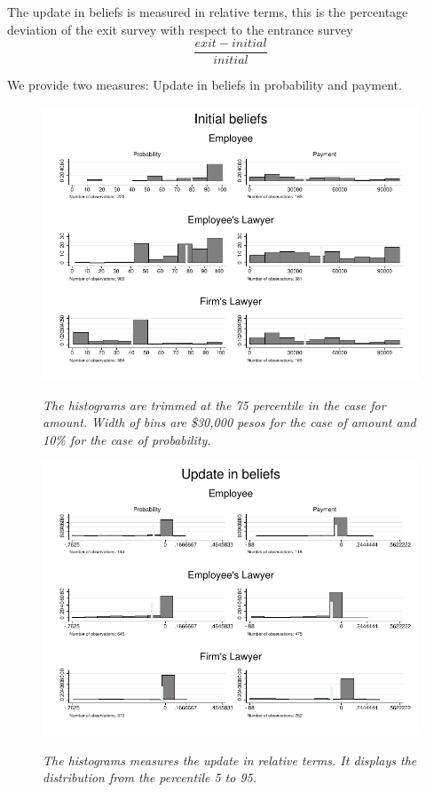 \documentclass[12pt]{article}
\theoremstyle{named}
\newcommand{\folder}{./Effect}
\begin{document}
The update in beliefs is measured in relative terms, this is the percentage deviation of the exit survey with respect to the entrance survey
\[\frac{exit-initial}{initial}\]

We provide two measures: Update in beliefs in probability and payment.\\

\begin{center}
\scriptsize{}
\end{center}

\begin{figure}[H]
\label{diff}
\begin{center}
\includegraphics[width=\textwidth]{./Figures/belief.pdf}
\end{center}
{\footnotesize \textit{The histograms are trimmed at the 75 percentile in the case for amount. Width of bins are \$30,000 pesos for the case of amount and 10\% for the case of probability.}}
\end{figure}


\begin{figure}[H]
\label{update}
\begin{center}
\includegraphics[width=\textwidth]{./Figures/update_belief.pdf}
\end{center}
{\footnotesize \textit{The histograms measures the update in relative terms. It displays the distribution from the percentile 5 to 95.}}
\end{figure}
\end{document}
